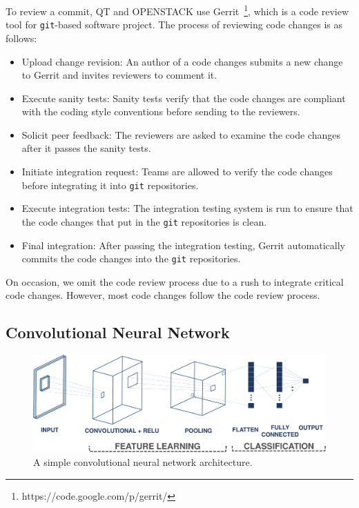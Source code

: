 To review a commit, QT and OPENSTACK use Gerrit~\footnote{https://code.google.com/p/gerrit/}, which is a code review tool for \texttt{git}-based software project. The process of reviewing code changes is as follows:
\begin{itemize}
    \item Upload change revision: An author of a code changes submits a new change to Gerrit and invites reviewers to comment it.
    \item Execute sanity tests: Sanity tests verify that the code changes are compliant with the coding style conventions before sending to the reviewers.
    \item Solicit peer feedback: The reviewers are asked to examine the code changes after it passes the sanity tests.
    \item Initiate integration request: Teams are allowed to verify the code changes before integrating it into \texttt{git} repositories.
    \item Execute integration tests: The integration testing system is run to ensure that the code changes that put in the \texttt{git} repositories is clean.
    \item Final integration: After passing the integration testing, Gerrit automatically commits the code changes into the \texttt{git} repositories.
\end{itemize}

On occasion,  we omit the code review process due to a rush to integrate critical code
changes. However, most code changes follow the code review process.


\subsection{Convolutional Neural Network}
\label{sec:background_cnn}

\begin{figure}[t!]
	\center
	\includegraphics[scale=0.3]{figs/cnn.pdf}
	\caption{A simple convolutional neural network architecture.}
	\label{fig:cnn}
\end{figure}

